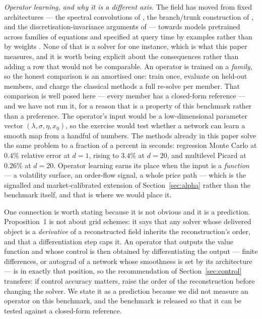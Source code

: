 \documentclass[conference]{IEEEtran}
\begin{document}
\emph{Operator learning, and why it is a different axis.} The field has moved from fixed architectures
--- the spectral convolutions of \cite{li2021fourier}, the branch/trunk construction of
\cite{lu2021learning}, and the discretisation-invariance arguments of \cite{raonic2023convolutional} ---
towards models pretrained across families of equations and specified at query time by examples rather
than by weights \cite{yang2024pde}. None of that is a solver for one instance, which is what this
paper measures, and it is worth being explicit about the consequences rather than adding a row that
would not be comparable. An operator is trained on a \emph{family}, so the honest comparison is an
amortised one: train once, evaluate on held-out members, and charge the classical methods a full
re-solve per member. That comparison is well posed here --- every member has a closed-form reference --- and we have not
run it, for a reason that is a property of this benchmark rather than a preference. The operator's
input would be a low-dimensional parameter vector $(\lambda, \sigma, \eta, x_0)$, so the exercise would
test whether a network can learn a smooth map from a handful of numbers. The methods already in this
paper solve the same problem to a fraction of a percent in seconds: regression Monte
Carlo at $0.4\%$ relative error at $d=1$, rising to $3.4\%$ at $d=20$, and multilevel Picard at
$0.26\%$ at $d=20$. Operator learning earns its place when the input is a \emph{function} --- a volatility
surface, an order-flow signal, a whole price path --- which is the signalled and market-calibrated
extension of Section~\ref{sec:alpha} rather than the benchmark itself, and that is where we would place
it.

One connection is worth stating because it is not obvious and it is a prediction. Proposition~1
is not about grid schemes: it says that any solver whose delivered object is a \emph{derivative} of a
reconstructed field inherits the reconstruction's order, and that a differentiation step caps it. An
operator that outputs the value function and whose control is then obtained by differentiating the
output --- finite differences, or autograd of a network whose smoothness is set by its architecture ---
is in exactly that position, so the recommendation of Section~\ref{sec:control} transfers: if control
accuracy matters, raise the order of the reconstruction before changing the solver. We state it as a
prediction because we did not measure an operator on this benchmark, and the benchmark is released so
that it can be tested against a closed-form reference.
\end{document}
